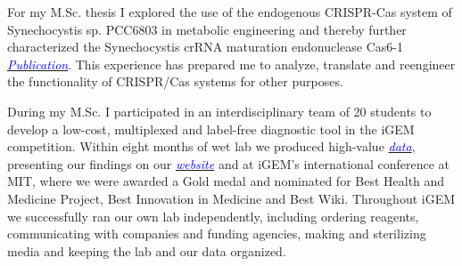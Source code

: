 \documentclass[11pt,a4paper,sans]{moderncv}
\begin{document}
\begin{spacing}{1.1}
For my M.Sc. thesis I explored the use of the endogenous CRISPR-Cas system of Synechocystis sp. PCC6803 in metabolic engineering and thereby further characterized the Synechocystis crRNA maturation endonuclease Cas6-1
{\href{https://www.tandfonline.com/eprint/vmAQ3vjYGdZIZpIKQTIT/full}{\textcolor{blue}{{\textit{Publication}}}}}.
This experience has prepared me to analyze, translate and reengineer the functionality of CRISPR/Cas systems for other purposes. %
\par\vspace*{3mm}
During my M.Sc. I participated in an interdisciplinary team of 20 students to develop a low-cost, multiplexed and label-free diagnostic tool in the iGEM competition.
Within eight months of wet lab we produced high-value {\href{https://www.ncbi.nlm.nih.gov/pubmed/29803867}{\textcolor{blue}{\textit{data}}}}, presenting our findings on our 
{\href{http://2015.igem.org/Team:Freiburg/Home_Intro}{\textcolor{blue}{\textit{website}}}} and at iGEM's international conference at MIT, where we were awarded a Gold medal and nominated for Best Health and Medicine Project, Best Innovation in Medicine and Best Wiki.
Throughout iGEM we successfully ran our own lab independently, including ordering reagents, communicating with companies and funding agencies, making and sterilizing media and keeping the lab and our data organized. \par


\end{spacing}
\end{document}
